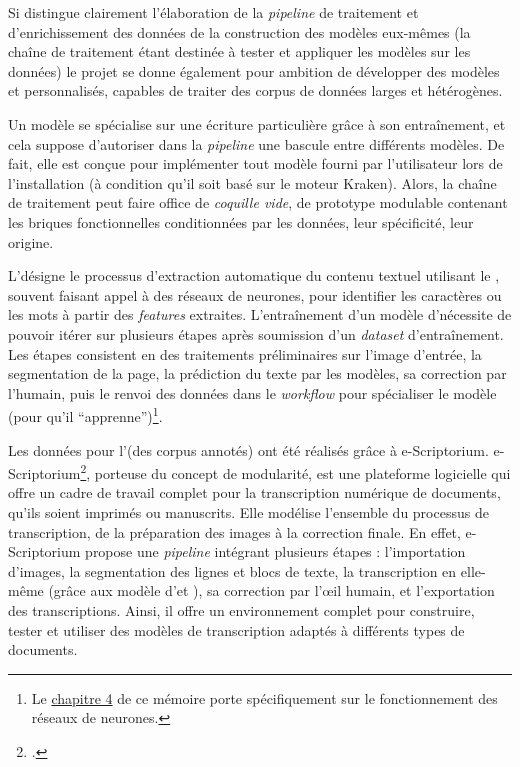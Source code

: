 Si \gaga distingue
clairement l'élaboration de la \textit{pipeline} de traitement et
d'enrichissement des données de la construction des modèles eux-mêmes (la chaîne de traitement étant destinée à tester et appliquer les modèles sur les données) le projet se donne également pour ambition de développer des modèles \htr et \tal
personnalisés, capables de traiter des corpus de données larges et
hétérogènes.

Un modèle \htr se spécialise sur une écriture particulière
grâce à son entraînement, et cela suppose d'autoriser dans la \textit{pipeline}
une bascule entre différents modèles. De fait, elle est conçue pour
implémenter tout modèle fourni par l'utilisateur lors de l'installation
(à condition qu'il soit basé sur le moteur Kraken). Alors, la chaîne de
traitement peut faire office de \textit{coquille vide}, de prototype
modulable contenant les briques fonctionnelles conditionnées par les
données, leur spécificité, leur origine.

L'\htr désigne le processus d'extraction automatique du contenu textuel
utilisant le \ml, souvent faisant appel à des réseaux de
neurones, pour identifier les caractères ou les mots à partir des
\emph{features} extraites. L'entraînement d'un
modèle d'\htr nécessite de pouvoir itérer sur plusieurs étapes après
soumission d'un \textit{dataset} d'entraînement. Les étapes consistent en des
traitements préliminaires sur l'image d'entrée, la segmentation de la
page, la prédiction du texte par les modèles, sa correction par
l'humain, puis le renvoi des données dans le \textit{workflow} pour
spécialiser le modèle (pour qu'il ``apprenne'')\footnote{Le \hyperlink{chapitre-4-modele}{chapitre 4} de ce mémoire porte spécifiquement sur le fonctionnement des réseaux de neurones.}.

Les données pour l'\htr (des corpus annotés) ont été réalisés grâce à
e-Scriptorium. e-Scriptorium\footcite{noauthor_escriptorium_nodate}, porteuse du concept de modularité, est une plateforme logicielle qui offre un cadre de travail complet pour la transcription numérique de documents, qu'ils soient imprimés ou manuscrits. Elle modélise l'ensemble du processus de transcription, de la préparation des images à la correction finale. En effet, e-Scriptorium propose une \textit{pipeline} intégrant plusieurs étapes : l'importation d'images, la segmentation des lignes et blocs de texte, la transcription en elle-même (grâce aux modèle d'\ocr et \htr), sa correction par l'œil humain, et l'exportation des transcriptions. Ainsi, il offre un environnement complet pour construire, tester et utiliser des modèles de transcription adaptés à différents types de documents. 

